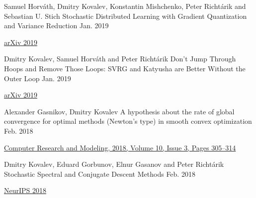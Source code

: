 
\begin{cventries}

\cventry
{Samuel Horváth, Dmitry Kovalev, Konstantin Mishchenko, Peter Richtárik and Sebastian U. Stich} %
{Stochastic Distributed Learning with Gradient Quantization and Variance Reduction} %
{} %
{Jan. 2019} %
{ %
	\begin{cvitems}
		\item {\href{https://arxiv.org/abs/1904.05115}{arXiv 2019}}
	\end{cvitems}
}

\cventry
{Dmitry Kovalev, Samuel Horváth and Peter Richtárik} %
{Don't Jump Through Hoops and Remove Those Loops: SVRG and Katyusha are Better Without the Outer Loop} %
{} %
{Jan. 2019} %
{ %
	\begin{cvitems}
		\item {\href{https://arxiv.org/abs/1901.08689}{arXiv 2019}}
	\end{cvitems}
}


\cventry
{Alexander Gasnikov, Dmitry Kovalev	} %
{A hypothesis about the rate of global convergence for optimal methods (Newton's type) in smooth convex optimization } %
{} %
{Feb. 2018} %
{ %
	\begin{cvitems}
		\item {\href{http://www.mathnet.ru/php/archive.phtml?wshow=paper\&jrnid=crm\&paperid=253\&option\_lang=eng}{
				Computer Research and Modeling, 2018,	Volume 10,	Issue 3,	Pages 305–314}}
	\end{cvitems}
}


\cventry
{Dmitry Kovalev, Eduard Gorbunov, Elnur Gasanov and Peter Richtárik} %
{Stochastic Spectral and Conjugate Descent Methods} %
{} %
{Feb. 2018} %
{ %
\begin{cvitems}
\item {\href{https://papers.nips.cc/paper/7596-stochastic-spectral-and-conjugate-descent-methods}{NeurIPS 2018}}
\end{cvitems}
}



\end{cventries}